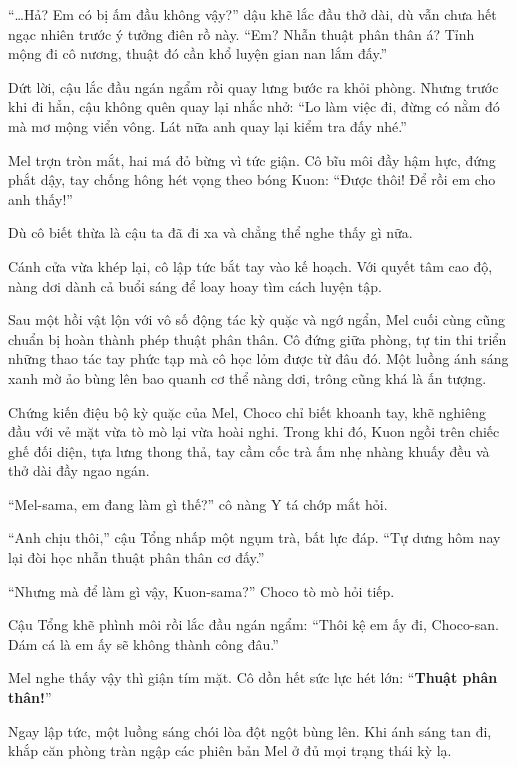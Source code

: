 \documentclass[../main.tex]{subfiles}
\begin{document}
``\dots Hả? Em có bị ấm đầu không vậy?'' dậu khẽ lắc đầu thở dài, dù vẫn chưa hết ngạc nhiên trước ý tưởng điên rồ này. ``Em? Nhẫn thuật phân thân á? Tỉnh mộng đi cô nương, thuật đó cần khổ luyện gian nan lắm đấy.''

Dứt lời, cậu lắc đầu ngán ngẩm rồi quay lưng bước ra khỏi phòng. Nhưng trước khi đi hẳn, cậu không quên quay lại nhắc nhở: ``Lo làm việc đi, đừng có nằm đó mà mơ mộng viển vông. Lát nữa anh quay lại kiểm tra đấy nhé.''

Mel trợn tròn mắt, hai má đỏ bừng vì tức giận. Cô bĩu môi đầy hậm hực, đứng phắt dậy, tay chống hông hét vọng theo bóng Kuon: ``Được thôi! Để rồi em cho anh thấy!''

Dù cô biết thừa là cậu ta đã đi xa và chẳng thể nghe thấy gì nữa.

Cánh cửa vừa khép lại, cô lập tức bắt tay vào kế hoạch. Với quyết tâm cao độ, nàng dơi dành cả buổi sáng để loay hoay tìm cách luyện tập.

\ct

Sau một hồi vật lộn với vô số động tác kỳ quặc và ngớ ngẩn, Mel cuối cùng cũng chuẩn bị hoàn thành phép thuật phân thân. Cô đứng giữa phòng, tự tin thi triển những thao tác tay phức tạp mà cô học lỏm được từ đâu đó. Một luồng ánh sáng xanh mờ ảo bùng lên bao quanh cơ thể nàng dơi, trông cũng khá là ấn tượng.


Chứng kiến điệu bộ kỳ quặc của Mel, Choco chỉ biết khoanh tay, khẽ nghiêng đầu với vẻ mặt vừa tò mò lại vừa hoài nghi. Trong khi đó, Kuon ngồi trên chiếc ghế đối diện, tựa lưng thong thả, tay cầm cốc trà ấm nhẹ nhàng khuấy đều và thở dài đầy ngao ngán.

``Mel-sama, em đang làm gì thế?'' cô nàng Y tá chớp mắt hỏi.

``Anh chịu thôi,'' cậu Tổng nhấp một ngụm trà, bất lực đáp. ``Tự dưng hôm nay lại đòi học nhẫn thuật phân thân cơ đấy.''

``Nhưng mà để làm gì vậy, Kuon-sama?'' Choco tò mò hỏi tiếp.

Cậu Tổng khẽ phình môi rồi lắc đầu ngán ngẩm: ``Thôi kệ em ấy đi, Choco-san. Dám cá là em ấy sẽ không thành công đâu.''

Mel nghe thấy vậy thì giận tím mặt. Cô dồn hết sức lực hét lớn: ``\textbf{Thuật phân thân!}''

Ngay lập tức, một luồng sáng chói lòa đột ngột bùng lên. Khi ánh sáng tan đi, khắp căn phòng tràn ngập các phiên bản Mel ở đủ mọi trạng thái kỳ lạ.
\end{document}
